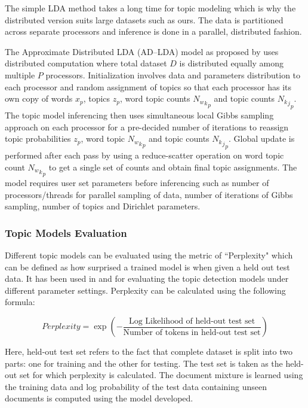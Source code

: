The simple LDA method takes a long time for topic modeling which is why the distributed version suits large datasets such as ours. The data is partitioned across separate processors and inference is done in a parallel, distributed fashion. 

The Approximate Distributed LDA (AD--LDA) model as proposed by \cite{newman2009distributed} uses distributed computation where total dataset $D$ is distributed equally among multiple $P$ processors. Initialization involves data and parameters distribution to each processor and random assignment of topics so that each processor has its own copy of words $x_p$, topics $z_p$, word topic counts ${{{N_w}_k}_p}$ and topic counts ${{{N_k}_j}_p}$. 
The topic model inferencing then uses simultaneous local Gibbs sampling approach on each processor for a pre-decided number of iterations to reassign topic probabilities $z_p$, word topic ${{N_w}_k}_p$ and topic counts ${{N_k}_j}_p$.
Global update is performed after each pass by using a reduce-scatter operation on word topic count ${{N_w}_k}_p$ to get a single set of counts and obtain final topic assignments.
The model requires user set parameters before inferencing such as number of processors/threads for parallel sampling of data, number of iterations of Gibbs sampling, number of topics and Dirichlet parameters. 

\subsubsection{Topic Models Evaluation}

 Different topic models can be evaluated using the metric of ``Perplexity" which can be defined as how surprised a trained model is when given a held out test data. It has been used in \cite{newman2009distributed} and \cite{blei2003latent} for evaluating the topic detection models under different parameter settings. Perplexity can be calculated using the following formula:

$$Perplexity= \exp(-\dfrac{\text{Log Likelihood of held-out test set}}{\text{Number of tokens in held-out test set}})$$


Here, held-out test set refers to the fact that complete dataset is split into two parts: one for training and the other for testing. The test set is taken as the held-out set for which perplexity is calculated. The document mixture is learned using the training data and log probability of the test data containing unseen documents is computed using the model developed.

